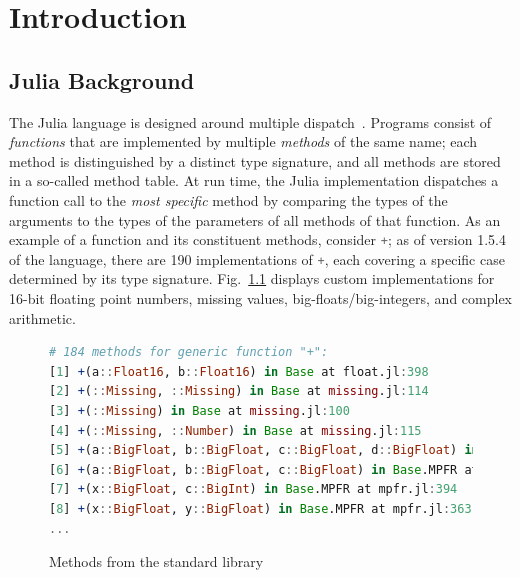 \documentclass[oneside,openright,titlepage,numbers=noenddot,%
headinclude,footinclude,cleardoublepage=empty,abstract=on,
BCOR=5mm,paper=a4,fontsize=11pt,
dvipsnames
]{scrreprt}
\renewcommand{\c}[1]{\lstinline[language=Julia]!#1!\xspace}
\begin{document}

\chapter{Introduction}%
\label{chap-intro}

\section{Julia Background}%
\label{sec-julia}

The Julia language is designed around multiple dispatch~\cite{BezansonEKS17}.
Programs consist of \emph{functions} that are implemented by multiple
\emph{methods} of the same name; each method is distinguished by a distinct type
signature, and all methods are stored in a so-called method table.
At run time, the Julia implementation dispatches a function call to
the \emph{most specific} method by comparing the types of the arguments to the
types of the parameters of all methods of that function. As an example of a
function and its constituent methods, consider \c{+}; as of version 1.5.4 of the
language, there are 190 implementations of \c{+}, each covering a
specific case determined by its type signature. Fig.~\ref{plus} displays custom
implementations for 16-bit floating point numbers, missing values,
big-floats/big-integers, and complex arithmetic.

\begin{figure}
\begin{lstlisting}[language=julia]
# 184 methods for generic function "+":
[1] +(a::Float16, b::Float16) in Base at float.jl:398
[2] +(::Missing, ::Missing) in Base at missing.jl:114
[3] +(::Missing) in Base at missing.jl:100
[4] +(::Missing, ::Number) in Base at missing.jl:115
[5] +(a::BigFloat, b::BigFloat, c::BigFloat, d::BigFloat) in Base.MPFR at mpfr.jl:541
[6] +(a::BigFloat, b::BigFloat, c::BigFloat) in Base.MPFR at mpfr.jl:535
[7] +(x::BigFloat, c::BigInt) in Base.MPFR at mpfr.jl:394
[8] +(x::BigFloat, y::BigFloat) in Base.MPFR at mpfr.jl:363
...
\end{lstlisting}
\caption{Methods from the standard library}\label{plus}
\end{figure}
\end{document}

